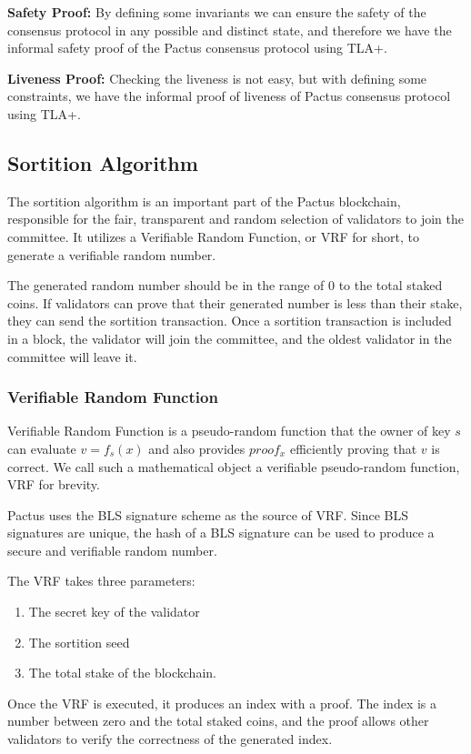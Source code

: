 \documentclass{novel}
\begin{document}
\noindent \textbf{Safety Proof:} By defining some invariants we can ensure the safety of the consensus protocol in any possible and distinct state, and therefore we have the informal safety proof of the Pactus consensus protocol using TLA+.

\noindent \textbf{Liveness Proof:} Checking the liveness is not easy, but with defining some constraints, we have the informal proof of liveness of Pactus consensus protocol using TLA+.

\subsection{Sortition Algorithm}
The sortition algorithm is an important part of the Pactus blockchain, responsible for the fair, transparent and random selection of validators to join the committee. It utilizes a Verifiable Random Function, or VRF for short, to generate a verifiable random number.

The generated random number should be in the range of 0 to the total staked coins. If validators can prove that their generated number is less than their stake, they can send the sortition transaction. Once a sortition transaction is included in a block, the validator will join the committee, and the oldest validator in the committee will leave it.

\subsubsection{Verifiable Random Function}
Verifiable Random Function is a pseudo-random function that the owner of key $s$ can evaluate $v = f_s(x)$ and also provides $proof_{x}$  efficiently proving that $v$ is correct. We call such a mathematical object a verifiable pseudo-random function, VRF for brevity.

Pactus uses the BLS signature scheme as the source of VRF. Since BLS signatures are unique, the hash of a BLS signature can be used to produce a secure and verifiable random number.

The VRF takes three parameters:
\begin{enumerate}
  \item The secret key of the validator
  \item The sortition seed
  \item The total stake of the blockchain.
\end{enumerate}
Once the VRF is executed, it produces an index with a proof. The index is a number between zero and the total staked coins, and the proof allows other validators to verify the correctness of the generated index.
\end{document}
